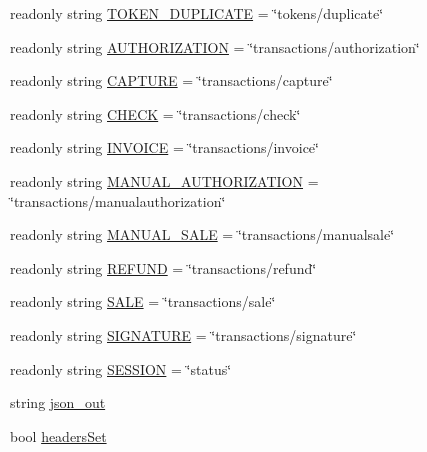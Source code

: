 \begin{DoxyCompactItemize}
\item 
readonly string \mbox{\hyperlink{class_form_sim_1_1_rest_handler_afd87386544c94ad11669b905304cda99}{T\+O\+K\+E\+N\+\_\+\+D\+U\+P\+L\+I\+C\+A\+TE}} = \char`\"{}tokens/duplicate\char`\"{}
\item 
readonly string \mbox{\hyperlink{class_form_sim_1_1_rest_handler_a33f4985d9ea1beb7984876f9e992eaae}{A\+U\+T\+H\+O\+R\+I\+Z\+A\+T\+I\+ON}} = \char`\"{}transactions/authorization\char`\"{}
\item 
readonly string \mbox{\hyperlink{class_form_sim_1_1_rest_handler_afb28bbff572b84c26be4dddf30aa0bdb}{C\+A\+P\+T\+U\+RE}} = \char`\"{}transactions/capture\char`\"{}
\item 
readonly string \mbox{\hyperlink{class_form_sim_1_1_rest_handler_abe32a138ecc549cfc16cc9846d4ca468}{C\+H\+E\+CK}} = \char`\"{}transactions/check\char`\"{}
\item 
readonly string \mbox{\hyperlink{class_form_sim_1_1_rest_handler_adee0030a983637e00e79cda3b5a1dfb6}{I\+N\+V\+O\+I\+CE}} = \char`\"{}transactions/invoice\char`\"{}
\item 
readonly string \mbox{\hyperlink{class_form_sim_1_1_rest_handler_a11a3ee0812c27c88988615f24ecb25dc}{M\+A\+N\+U\+A\+L\+\_\+\+A\+U\+T\+H\+O\+R\+I\+Z\+A\+T\+I\+ON}} = \char`\"{}transactions/manualauthorization\char`\"{}
\item 
readonly string \mbox{\hyperlink{class_form_sim_1_1_rest_handler_a8c04225218b1ea8873b6a7e4635147bf}{M\+A\+N\+U\+A\+L\+\_\+\+S\+A\+LE}} = \char`\"{}transactions/manualsale\char`\"{}
\item 
readonly string \mbox{\hyperlink{class_form_sim_1_1_rest_handler_a1210812ce0844c10de03694bcffb464c}{R\+E\+F\+U\+ND}} = \char`\"{}transactions/refund\char`\"{}
\item 
readonly string \mbox{\hyperlink{class_form_sim_1_1_rest_handler_aa120f59ea2b44fc2ad0e2d95ab9dd18f}{S\+A\+LE}} = \char`\"{}transactions/sale\char`\"{}
\item 
readonly string \mbox{\hyperlink{class_form_sim_1_1_rest_handler_a54fcdefde2b8518a8ce326ca362cf09d}{S\+I\+G\+N\+A\+T\+U\+RE}} = \char`\"{}transactions/signature\char`\"{}
\item 
readonly string \mbox{\hyperlink{class_form_sim_1_1_rest_handler_af5d7a5c25979759bf51b7ede862718b2}{S\+E\+S\+S\+I\+ON}} = \char`\"{}status\char`\"{}
\item 
string \mbox{\hyperlink{class_form_sim_1_1_rest_handler_a2b2da7000557616345192ffd589b4e16}{json\+\_\+out}}
\item 
bool \mbox{\hyperlink{class_form_sim_1_1_rest_handler_ad2cd92751f0b8f3317205b32d1ba401d}{headers\+Set}}
\end{DoxyCompactItemize}
